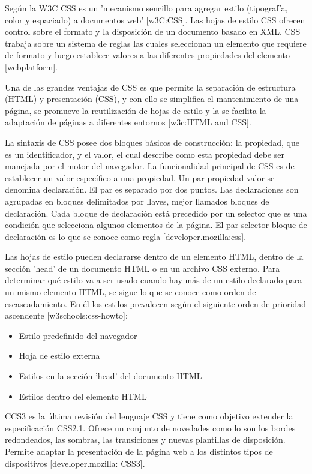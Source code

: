 Según la W3C CSS es un 'mecanismo sencillo para agregar estilo (tipografía, color y espaciado) a documentos web' [w3C:CSS]. Las hojas de estilo CSS ofrecen control sobre el formato y la disposición de un documento basado en XML. CSS trabaja sobre un sistema de reglas las cuales seleccionan un elemento que requiere de formato y luego establece valores a las diferentes propiedades del elemento [webplatform].

Una de las grandes ventajas de CSS es que permite la separación de estructura (HTML) y presentación (CSS), y con ello se simplifica el mantenimiento de una página, se promueve la reutilización de hojas de estilo y la se facilita la adaptación de páginas a diferentes entornos [w3c:HTML and CSS].

La sintaxis de CSS posee dos bloques básicos de construcción: la propiedad, que es un identificador, y el valor, el cual describe como esta propiedad debe ser manejada por el motor del navegador. La funcionalidad principal de CSS es de establecer un valor específico a una propiedad. Un par propiedad-valor se denomina declaración. El par es separado por dos puntos. Las declaraciones son agrupadas en bloques delimitados por llaves, mejor llamados bloques de declaración. Cada bloque de declaración está precedido por un selector que es una condición que selecciona algunos elementos de la página. El par selector-bloque de declaración es lo que se conoce como regla [developer.mozilla:css].



Las hojas de estilo pueden declararse dentro de un elemento HTML, dentro de la sección 'head' de un documento HTML o en un archivo CSS externo. Para determinar qué estilo va a ser usado cuando hay más de un estilo declarado para un mismo elemento HTML, se sigue lo que se conoce como orden de escascadamiento. En él los estilos prevalecen según el siguiente orden de prioridad ascendente [w3schools:css-howto]:

\begin{itemize}
  \item Estilo predefinido del navegador
  \item Hoja de estilo externa
  \item Estilos en la sección 'head' del documento HTML
  \item Estilos dentro del elemento HTML
\end{itemize}

CCS3 es la última revisión del lenguaje CSS y tiene como objetivo extender la especificación CSS2.1. Ofrece un conjunto de novedades como lo son los bordes redondeados, las sombras, las transiciones y nuevas plantillas de disposición. Permite adaptar la presentación de la página web a los distintos tipos de dispositivos [developer.mozilla: CSS3].


